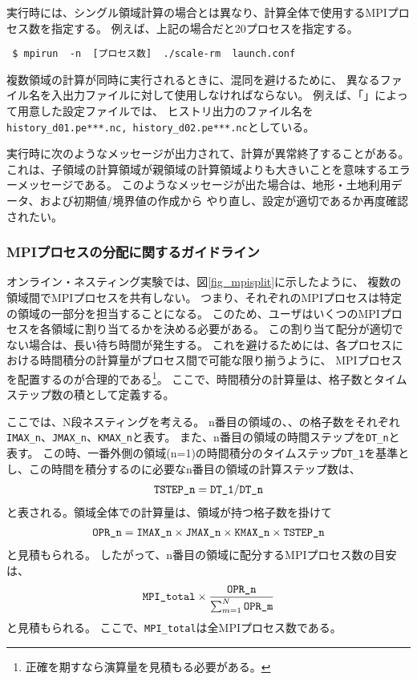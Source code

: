 実行時には、シングル領域計算の場合とは異なり、計算全体で使用するMPIプロセス数を指定する。
例えば、上記の場合だと20プロセスを指定する。
\begin{verbatim}
 $ mpirun  -n  [プロセス数]  ./scale-rm  launch.conf
\end{verbatim}

複数領域の計算が同時に実行されるときに、混同を避けるために、
異なるファイル名を入出力ファイルに対して使用しなければならない。
例えば、「\makeconftool」によって用意した設定ファイルでは、
ヒストリ出力のファイル名を\verb|history_d01.pe***.nc, history_d02.pe***.nc|としている。

実行時に次のようなメッセージが出力されて、計算が異常終了することがある。
これは、子領域の計算領域が親領域の計算領域よりも大きいことを意味するエラーメッセージである。
このようなメッセージが出た場合は、地形・土地利用データ、および初期値/境界値の作成から
やり直し、設定が適切であるか再度確認されたい。

\subsubsection{MPIプロセスの分配に関するガイドライン}
オンライン・ネスティング実験では、図\ref{fig_mpisplit}に示したように、
複数の領域間でMPIプロセスを共有しない。
つまり、それぞれのMPIプロセスは特定の領域の一部分を担当することになる。
このため、ユーザはいくつのMPIプロセスを各領域に割り当てるかを決める必要がある。
この割り当て配分が適切でない場合は、長い待ち時間が発生する。
これを避けるためには、各プロセスにおける時間積分の計算量がプロセス間で可能な限り揃うように、
MPIプロセスを配置するのが合理的である\footnote{正確を期すなら演算量を見積もる必要がある。}。
ここで、時間積分の計算量は、格子数とタイムステップ数の積として定義する。

ここでは、N段ネスティングを考える。
n番目の領域の{\XDIR}、{\YDIR}、{\ZDIR}の格子数をそれぞれ\verb|IMAX_n|、\verb|JMAX_n|、\verb|KMAX_n|と表す。
また、n番目の領域の時間ステップを\verb|DT_n|と表す。
この時、一番外側の領域(n=1)の時間積分のタイムステップ\verb|DT_1|を基準とし、この時間を積分するのに必要なn番目の領域の計算ステップ数は、
\begin{eqnarray}
 \verb|TSTEP_n| = \verb|DT_1| / \verb|DT_n|  \nonumber
\end{eqnarray}
と表される。領域全体での計算量は、領域が持つ格子数を掛けて
\begin{eqnarray}
 \verb|OPR_n| = \verb|IMAX_n| \times \verb|JMAX_n| \times \verb|KMAX_n| \times \verb|TSTEP_n| \nonumber
\end{eqnarray}
と見積もられる。
したがって、n番目の領域に配分するMPIプロセス数の目安は、
\begin{eqnarray}
 \verb|MPI_total| \times \frac{ \texttt{OPR\_n} }{ \sum_{m=1}^N \texttt{OPR\_m} }
\end{eqnarray}
と見積もられる。
ここで、\verb|MPI_total|は全MPIプロセス数である。


